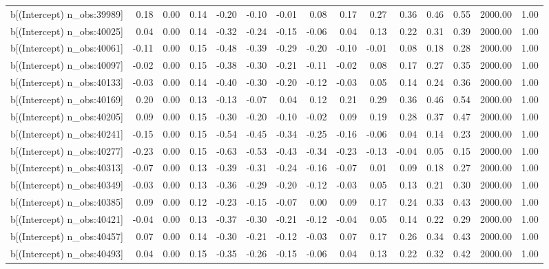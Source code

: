 \begin{table}[ht]
\begin{tabular}{rrrrrrrrrrrrrrr}
  b[(Intercept) n\_obs:39989] & 0.18 & 0.00 & 0.14 & -0.20 & -0.10 & -0.01 & 0.08 & 0.17 & 0.27 & 0.36 & 0.46 & 0.55 & 2000.00 & 1.00 \\ 
  b[(Intercept) n\_obs:40025] & 0.04 & 0.00 & 0.14 & -0.32 & -0.24 & -0.15 & -0.06 & 0.04 & 0.13 & 0.22 & 0.31 & 0.39 & 2000.00 & 1.00 \\ 
  b[(Intercept) n\_obs:40061] & -0.11 & 0.00 & 0.15 & -0.48 & -0.39 & -0.29 & -0.20 & -0.10 & -0.01 & 0.08 & 0.18 & 0.28 & 2000.00 & 1.00 \\ 
  b[(Intercept) n\_obs:40097] & -0.02 & 0.00 & 0.15 & -0.38 & -0.30 & -0.21 & -0.11 & -0.02 & 0.08 & 0.17 & 0.27 & 0.35 & 2000.00 & 1.00 \\ 
  b[(Intercept) n\_obs:40133] & -0.03 & 0.00 & 0.14 & -0.40 & -0.30 & -0.20 & -0.12 & -0.03 & 0.05 & 0.14 & 0.24 & 0.36 & 2000.00 & 1.00 \\ 
  b[(Intercept) n\_obs:40169] & 0.20 & 0.00 & 0.13 & -0.13 & -0.07 & 0.04 & 0.12 & 0.21 & 0.29 & 0.36 & 0.46 & 0.54 & 2000.00 & 1.00 \\ 
  b[(Intercept) n\_obs:40205] & 0.09 & 0.00 & 0.15 & -0.30 & -0.20 & -0.10 & -0.02 & 0.09 & 0.19 & 0.28 & 0.37 & 0.47 & 2000.00 & 1.00 \\ 
  b[(Intercept) n\_obs:40241] & -0.15 & 0.00 & 0.15 & -0.54 & -0.45 & -0.34 & -0.25 & -0.16 & -0.06 & 0.04 & 0.14 & 0.23 & 2000.00 & 1.00 \\ 
  b[(Intercept) n\_obs:40277] & -0.23 & 0.00 & 0.15 & -0.63 & -0.53 & -0.43 & -0.34 & -0.23 & -0.13 & -0.04 & 0.05 & 0.15 & 2000.00 & 1.00 \\ 
  b[(Intercept) n\_obs:40313] & -0.07 & 0.00 & 0.13 & -0.39 & -0.31 & -0.24 & -0.16 & -0.07 & 0.01 & 0.09 & 0.18 & 0.27 & 2000.00 & 1.00 \\ 
  b[(Intercept) n\_obs:40349] & -0.03 & 0.00 & 0.13 & -0.36 & -0.29 & -0.20 & -0.12 & -0.03 & 0.05 & 0.13 & 0.21 & 0.30 & 2000.00 & 1.00 \\ 
  b[(Intercept) n\_obs:40385] & 0.09 & 0.00 & 0.12 & -0.23 & -0.15 & -0.07 & 0.00 & 0.09 & 0.17 & 0.24 & 0.33 & 0.43 & 2000.00 & 1.00 \\ 
  b[(Intercept) n\_obs:40421] & -0.04 & 0.00 & 0.13 & -0.37 & -0.30 & -0.21 & -0.12 & -0.04 & 0.05 & 0.14 & 0.22 & 0.29 & 2000.00 & 1.00 \\ 
  b[(Intercept) n\_obs:40457] & 0.07 & 0.00 & 0.14 & -0.30 & -0.21 & -0.12 & -0.03 & 0.07 & 0.17 & 0.26 & 0.34 & 0.43 & 2000.00 & 1.00 \\ 
  b[(Intercept) n\_obs:40493] & 0.04 & 0.00 & 0.15 & -0.35 & -0.26 & -0.15 & -0.06 & 0.04 & 0.13 & 0.22 & 0.32 & 0.42 & 2000.00 & 1.00 \\ 

\end{tabular}
\end{table}
